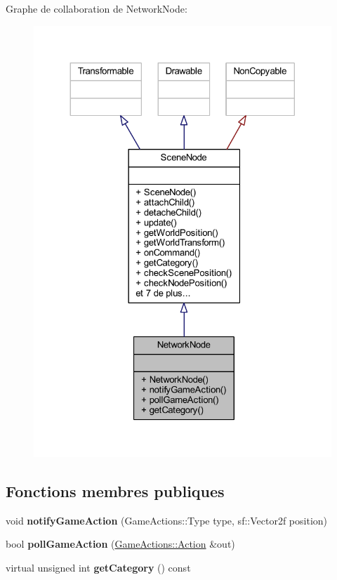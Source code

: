 Graphe de collaboration de Network\+Node\+:\nopagebreak
\begin{figure}[H]
\begin{center}
\leavevmode
\includegraphics[width=324pt]{class_network_node__coll__graph}
\end{center}
\end{figure}
\subsection*{Fonctions membres publiques}
\begin{DoxyCompactItemize}
\item 
\hypertarget{class_network_node_a76c8daddb63d9d2ea57a1e3096b0fcc1}{}\label{class_network_node_a76c8daddb63d9d2ea57a1e3096b0fcc1} 
void {\bfseries notify\+Game\+Action} (Game\+Actions\+::\+Type type, sf\+::\+Vector2f position)
\item 
\hypertarget{class_network_node_a324d5374146ccb8e1a77c932623464c1}{}\label{class_network_node_a324d5374146ccb8e1a77c932623464c1} 
bool {\bfseries poll\+Game\+Action} (\hyperlink{struct_game_actions_1_1_action}{Game\+Actions\+::\+Action} \&out)
\item 
\hypertarget{class_network_node_aae5b3c7b6f20f4a5ba695957b51e52bc}{}\label{class_network_node_aae5b3c7b6f20f4a5ba695957b51e52bc} 
virtual unsigned int {\bfseries get\+Category} () const
\end{DoxyCompactItemize}
